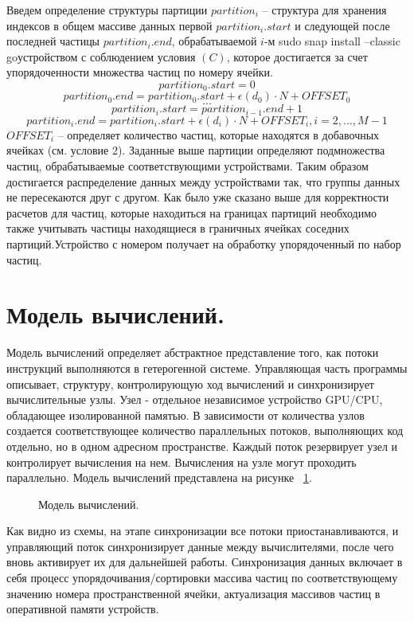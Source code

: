 Введем определение структуры партиции \(partition_i\) – структура для хранения индексов в общем массиве данных первой \(partition_{i}.start\) и следующей после последней частицы \(partition_{i}.end\), обрабатываемой \(i\)-м sudo snap install --classic goустройством с соблюдением условия 
\((C)\), которое достигается за счет упорядоченности множества частиц по номеру ячейки.  
\[
partition_{0}.start = 0
\]
\[
partition_{0}.end = partition_{0}.start + \epsilon (d_0) \cdot N + OFFSET_0 
\]
\[
...
\]
\[
partition_{i}.start = partition_{i-1}.end + 1
\]
\[
partition_{i}.end = partition_{i}.start + \epsilon (d_i) \cdot N + OFFSET_i, i=2,..., M - 1
\]
\(OFFSET_i\) – определяет количество частиц, которые находятся в добавочных ячейках (см. условие 2).
Заданные выше партиции определяют подмножества частиц, обрабатываемые соответствующими устройствами. Таким образом достигается распределение данных между устройствами так, что группы данных не пересекаются друг с другом. Как было уже сказано выше для корректности расчетов для частиц, которые находиться на границах партиций необходимо также учитывать частицы находящиеся в граничных ячейках соседних партиций.Устройство с номером  получает на обработку упорядоченный по  набор частиц. 

\section{Модель вычислений.}\label{sec:ch3/sect2}

Модель вычислений определяет абстрактное представление того, как потоки инструкций выполняются в гетерогенной системе. Управляющая часть программы описывает, структуру, контролирующую ход вычислений и синхронизирует вычислительные узлы. Узел - отдельное независимое устройство GPU/CPU, обладающее изолированной памятью. В зависимости от количества узлов создается соответствующее количество параллельных потоков, выполняющих код отдельно, но в одном адресном пространстве. Каждый поток резервирует узел и контролирует вычисления на нем. Вычисления на узле могут проходить параллельно. Модель вычислений представлена на рисунке ~\ref{fig:calc1}.
\begin{figure}[ht]
  \caption{Модель вычислений.}\label{fig:calc1}
\end{figure}

Как видно из схемы, на этапе синхронизации все потоки  приостанавливаются, и управляющий поток синхронизирует данные между вычислителями, после чего вновь активирует их для дальнейшей работы. Синхронизация данных включает в себя процесс упорядочивания/сортировки массива частиц по соответствующему значению номера пространственной ячейки, актуализация массивов частиц в оперативной памяти устройств. 

